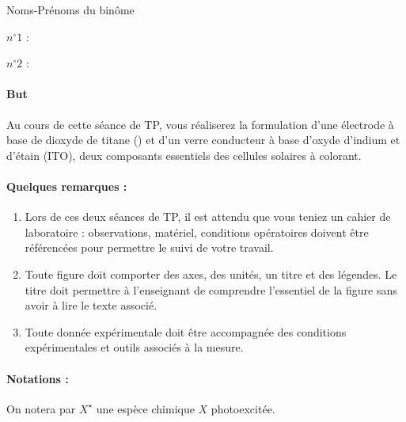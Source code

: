 \documentclass[twoside,a4paper,11pt,addpoints]{exam}%
\begin{document}
\begin{minipage}{0.33\textwidth}
Noms-Prénoms du binôme
\end{minipage}\begin{minipage}{0.33\textwidth}
$n^\circ 1$ :
\end{minipage}\begin{minipage}{0.33\textwidth}
$n^\circ 2$ :
\end{minipage}

\paragraph*{But} 
Au cours de cette séance de TP, vous réaliserez la formulation d'une électrode à base de dioxyde de titane () et d'un verre conducteur à base d'oxyde d'indium et d'étain (ITO), deux composants essentiels des cellules solaires à colorant.



\paragraph*{Quelques remarques :}
\begin{enumerate}
\item {\color{red} Lors de ces deux séances de TP, il est attendu que vous teniez un cahier de laboratoire : observations, matériel, conditions opératoires doivent être référencées pour permettre le suivi de votre travail.}
\item Toute figure doit comporter des axes, des unités, un titre et des légendes. Le titre doit permettre à l'enseignant de comprendre l'essentiel de la figure sans avoir à lire le texte associé.
\item Toute donnée expérimentale doit être accompagnée des conditions expérimentales et outils associés à la mesure.
\end{enumerate}


\paragraph*{Notations :}
On notera par $X^\star$ une espèce chimique $X$ photoexcitée.
\end{document}
